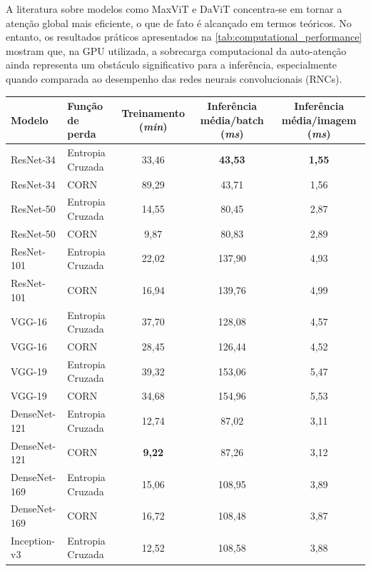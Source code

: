 A literatura sobre modelos como MaxViT e DaViT concentra-se em tornar a atenção global mais eficiente, o que de fato é alcançado em termos teóricos. No entanto, os resultados práticos apresentados na \autoref{tab:computational_performance} mostram que, na GPU utilizada, a sobrecarga computacional da auto-atenção ainda representa um obstáculo significativo para a inferência, especialmente quando comparada ao desempenho das redes neurais convolucionais (RNCs).

\begin{table}
    \centering
    \begin{tabular}{|l|l|c|c|c|}
        \hline
        \textbf{Modelo} & \textbf{Função de perda} & \textbf{Treinamento (\textit{min})} & \textbf{Inferência média/batch (\textit{ms})} & \textbf{Inferência média/imagem (\textit{ms})} \\
        \hline
        ResNet-34 & Entropia Cruzada & 33,46 & \textbf{43,53} & \textbf{1,55} \\
        \hline
        ResNet-34 & CORN & 89,29 & 43,71 & 1,56 \\
        \hline
        ResNet-50 & Entropia Cruzada & 14,55 & 80,45 & 2,87 \\
        \hline
        ResNet-50 & CORN & 9,87 & 80,83 & 2,89 \\
        \hline
        ResNet-101 & Entropia Cruzada & 22,02 & 137,90 & 4,93 \\
        \hline
        ResNet-101 & CORN & 16,94 & 139,76 & 4,99 \\
        \hline
        VGG-16 & Entropia Cruzada & 37,70 & 128,08 & 4,57 \\
        \hline
        VGG-16 & CORN & 28,45 & 126,44 & 4,52 \\
        \hline
        VGG-19 & Entropia Cruzada & 39,32 & 153,06 & 5,47 \\
        \hline
        VGG-19 & CORN & 34,68 & 154,96 & 5,53 \\
        \hline
        DenseNet-121 & Entropia Cruzada & 12,74 & 87,02 & 3,11 \\
        \hline
        DenseNet-121 & CORN & \textbf{9,22} & 87,26 & 3,12 \\
        \hline
        DenseNet-169 & Entropia Cruzada & 15,06 & 108,95 & 3,89 \\
        \hline
        DenseNet-169 & CORN & 16,72 & 108,48 & 3,87 \\
        \hline
        Inception-v3 & Entropia Cruzada & 12,52 & 108,58 & 3,88 \\

\end{tabular}
\end{table}
